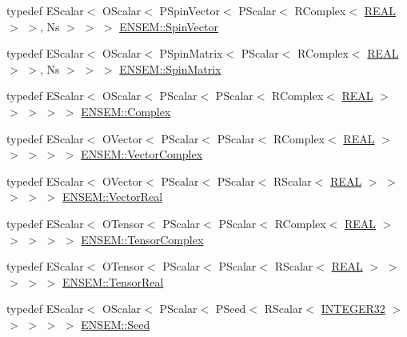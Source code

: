 \begin{DoxyCompactItemize}
\item 
typedef E\+Scalar$<$ O\+Scalar$<$ P\+Spin\+Vector$<$ P\+Scalar$<$ R\+Complex$<$ \mbox{\hyperlink{adat-devel_2lib_2ensem_2ensem__precision_8h_ad013361bb53824d5957cb0b391c72290}{R\+E\+AL}} $>$ $>$, Ns $>$ $>$ $>$ \mbox{\hyperlink{group__defs_ga4cb5c4207c68050d0bd3e3e2d614bc78}{E\+N\+S\+E\+M\+::\+Spin\+Vector}}
\item 
typedef E\+Scalar$<$ O\+Scalar$<$ P\+Spin\+Matrix$<$ P\+Scalar$<$ R\+Complex$<$ \mbox{\hyperlink{adat-devel_2lib_2ensem_2ensem__precision_8h_ad013361bb53824d5957cb0b391c72290}{R\+E\+AL}} $>$ $>$, Ns $>$ $>$ $>$ \mbox{\hyperlink{group__defs_gad066768e154e358a7f3c0708c774be29}{E\+N\+S\+E\+M\+::\+Spin\+Matrix}}
\item 
typedef E\+Scalar$<$ O\+Scalar$<$ P\+Scalar$<$ P\+Scalar$<$ R\+Complex$<$ \mbox{\hyperlink{adat-devel_2lib_2ensem_2ensem__precision_8h_ad013361bb53824d5957cb0b391c72290}{R\+E\+AL}} $>$ $>$ $>$ $>$ $>$ \mbox{\hyperlink{group__defs_gabaa4aa11d5212d34042d08bf0b2f9cc0}{E\+N\+S\+E\+M\+::\+Complex}}
\item 
typedef E\+Scalar$<$ O\+Vector$<$ P\+Scalar$<$ P\+Scalar$<$ R\+Complex$<$ \mbox{\hyperlink{adat-devel_2lib_2ensem_2ensem__precision_8h_ad013361bb53824d5957cb0b391c72290}{R\+E\+AL}} $>$ $>$ $>$ $>$ $>$ \mbox{\hyperlink{group__defs_gab151d837d71acacce0e1c38e91e04fa3}{E\+N\+S\+E\+M\+::\+Vector\+Complex}}
\item 
typedef E\+Scalar$<$ O\+Vector$<$ P\+Scalar$<$ P\+Scalar$<$ R\+Scalar$<$ \mbox{\hyperlink{adat-devel_2lib_2ensem_2ensem__precision_8h_ad013361bb53824d5957cb0b391c72290}{R\+E\+AL}} $>$ $>$ $>$ $>$ $>$ \mbox{\hyperlink{group__defs_ga3ccd78d00f8c76c389577cc0dbe460fc}{E\+N\+S\+E\+M\+::\+Vector\+Real}}
\item 
typedef E\+Scalar$<$ O\+Tensor$<$ P\+Scalar$<$ P\+Scalar$<$ R\+Complex$<$ \mbox{\hyperlink{adat-devel_2lib_2ensem_2ensem__precision_8h_ad013361bb53824d5957cb0b391c72290}{R\+E\+AL}} $>$ $>$ $>$ $>$ $>$ \mbox{\hyperlink{group__defs_gaa7d4b94401ce3fe4074e5133299e9924}{E\+N\+S\+E\+M\+::\+Tensor\+Complex}}
\item 
typedef E\+Scalar$<$ O\+Tensor$<$ P\+Scalar$<$ P\+Scalar$<$ R\+Scalar$<$ \mbox{\hyperlink{adat-devel_2lib_2ensem_2ensem__precision_8h_ad013361bb53824d5957cb0b391c72290}{R\+E\+AL}} $>$ $>$ $>$ $>$ $>$ \mbox{\hyperlink{group__defs_ga958dd8b23f0fe048624bd04c42201408}{E\+N\+S\+E\+M\+::\+Tensor\+Real}}
\item 
typedef E\+Scalar$<$ O\+Scalar$<$ P\+Scalar$<$ P\+Seed$<$ R\+Scalar$<$ \mbox{\hyperlink{adat-devel_2lib_2ensem_2ensem__precision_8h_af9ea51a62d33df371d837a018fe1a22e}{I\+N\+T\+E\+G\+E\+R32}} $>$ $>$ $>$ $>$ $>$ \mbox{\hyperlink{group__defs_ga8a5a983ab64ca8f6a5419885bacd4c40}{E\+N\+S\+E\+M\+::\+Seed}}

\end{DoxyCompactItemize}
